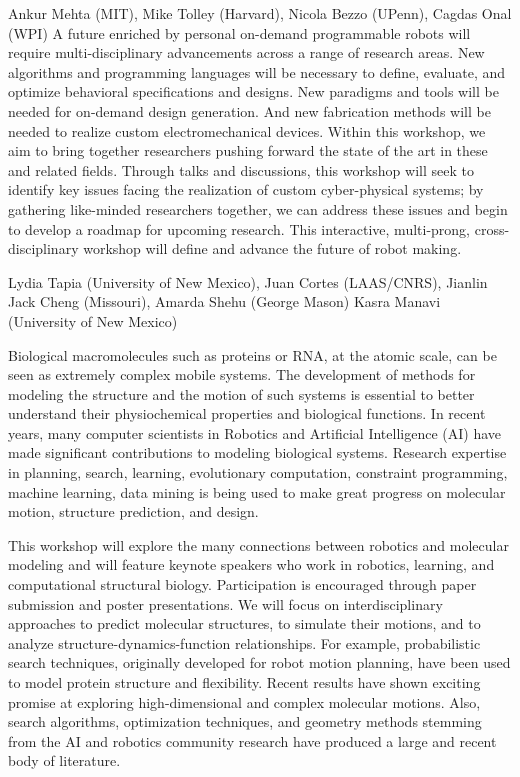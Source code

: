 \begin{spacing}{1.0}
{Ankur Mehta (MIT), Mike Tolley (Harvard), Nicola Bezzo (UPenn), Cagdas Onal (WPI)}
{
A future enriched by personal on-demand programmable robots will require multi-disciplinary advancements across a range of research areas. New algorithms and programming languages will be necessary to define, evaluate, and optimize behavioral specifications and designs. New paradigms and tools will be needed for on-demand design generation. And new fabrication methods will be needed to realize custom electromechanical devices. Within this workshop, we aim to bring together researchers pushing forward the state of the art in these and related fields. Through talks and discussions, this workshop will seek to identify key issues facing the realization of custom cyber-physical systems; by gathering like-minded researchers together, we can address these issues and begin to develop a roadmap for upcoming research. This interactive, multi-prong, cross-disciplinary workshop will define and advance the future of robot making.
}



{Lydia Tapia (University of New Mexico), Juan Cortes (LAAS/CNRS), Jianlin Jack Cheng (Missouri), Amarda Shehu (George Mason) Kasra Manavi (University of New Mexico)}
{
Biological macromolecules such as proteins or RNA, at the atomic scale, can be seen as extremely complex mobile systems. The development of methods for modeling the structure and the motion of such systems is essential to better understand their physiochemical properties and biological functions. In recent years, many computer scientists in Robotics and Artificial Intelligence (AI) have made significant contributions to modeling biological systems. Research expertise in planning, search, learning, evolutionary computation, constraint programming, machine learning, data mining is being used to make great progress on molecular motion, structure prediction, and design. 

This workshop will explore the many connections between robotics and molecular modeling and will feature keynote speakers who work in robotics, learning, and computational structural biology. Participation is encouraged through paper submission and poster presentations. We will focus on interdisciplinary approaches to predict molecular structures, to simulate their motions, and to analyze structure-dynamics-function relationships. For example, probabilistic search techniques, originally developed for robot motion planning, have been used to model protein structure and flexibility. Recent results have shown exciting promise at exploring high-dimensional and complex molecular motions. Also, search algorithms, optimization techniques, and geometry methods stemming from the AI and robotics community research have produced a large and recent body of literature. 

}
\end{spacing}
